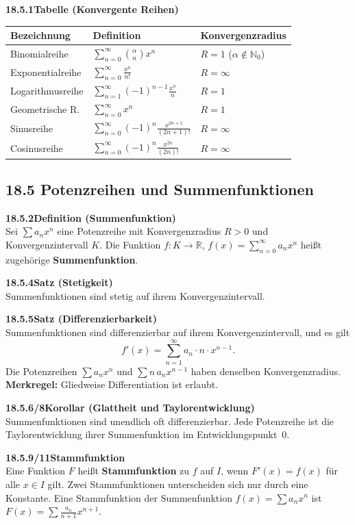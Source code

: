 \documentclass[a4paper,12pt]{article}
\newcommand{\gentry}[3]{%
  \noindent\textbf{#1\quad #2}\nopagebreak\\[0.2em]
  #3\par\smallskip
}
\begin{document}
\gentry{18.5.1}{Tabelle (Konvergente Reihen)}{%
  \begin{tabular}{lll}
    \toprule
    Bezeichnung & Definition & Konvergenzradius \\
    \midrule
    Binomialreihe   & $\sum_{n=0}^{\infty}\binom{\alpha}{n}x^n$             & $R=1$ ($\alpha\notin\mathbb{N}_0$) \\
    Exponentialreihe & $\sum_{n=0}^{\infty}\frac{x^n}{n!}$                  & $R=\infty$ \\
    Logarithmusreihe & $\sum_{n=1}^{\infty}(-1)^{n-1}\frac{x^n}{n}$         & $R=1$ \\
    Geometrische R.  & $\sum_{n=0}^{\infty} x^n$                             & $R=1$ \\
    Sinusreihe       & $\sum_{n=0}^{\infty}(-1)^n\frac{x^{2n+1}}{(2n+1)!}$ & $R=\infty$ \\
    Cosinusreihe     & $\sum_{n=0}^{\infty}(-1)^n\frac{x^{2n}}{(2n)!}$     & $R=\infty$ \\
    \bottomrule
  \end{tabular}
}

\subsection*{18.5 \quad Potenzreihen und Summenfunktionen}

\gentry{18.5.2}{Definition (Summenfunktion)}{%
  Sei $\sum a_n x^n$ eine Potenzreihe mit Konvergenzradius $R > 0$ und
  Konvergenzintervall $K$. Die Funktion $f:K\to\mathbb{R}$,
  $f(x) = \sum_{n=0}^{\infty} a_n x^n$ heißt zugehörige \textbf{Summenfunktion}.
}

\gentry{18.5.4}{Satz (Stetigkeit)}{%
  Summenfunktionen sind stetig auf ihrem Konvergenzintervall.
}

\gentry{18.5.5}{Satz (Differenzierbarkeit)}{%
  Summenfunktionen sind differenzierbar auf ihrem Konvergenzintervall, und es gilt
  \[
    f'(x) = \sum_{n=1}^{\infty} a_n \cdot n \cdot x^{n-1}.
  \]
  Die Potenzreihen $\sum a_n x^n$ und $\sum n\,a_n x^{n-1}$ haben denselben
  Konvergenzradius. \textbf{Merkregel:} Gliedweise Differentiation ist erlaubt.
}

\gentry{18.5.6/8}{Korollar (Glattheit und Taylorentwicklung)}{%
  Summenfunktionen sind unendlich oft differenzierbar. Jede Potenzreihe ist
  die Taylorentwicklung ihrer Summenfunktion im Entwicklungspunkt~$0$.
}

\gentry{18.5.9/11}{Stammfunktion}{%
  Eine Funktion $F$ heißt \textbf{Stammfunktion} zu $f$ auf $I$, wenn
  $F'(x) = f(x)$ für alle $x \in I$ gilt. Zwei Stammfunktionen unterscheiden
  sich nur durch eine Konstante. Eine Stammfunktion der Summenfunktion
  $f(x) = \sum a_n x^n$ ist $F(x) = \sum \frac{a_n}{n+1}x^{n+1}$.
}
\end{document}
